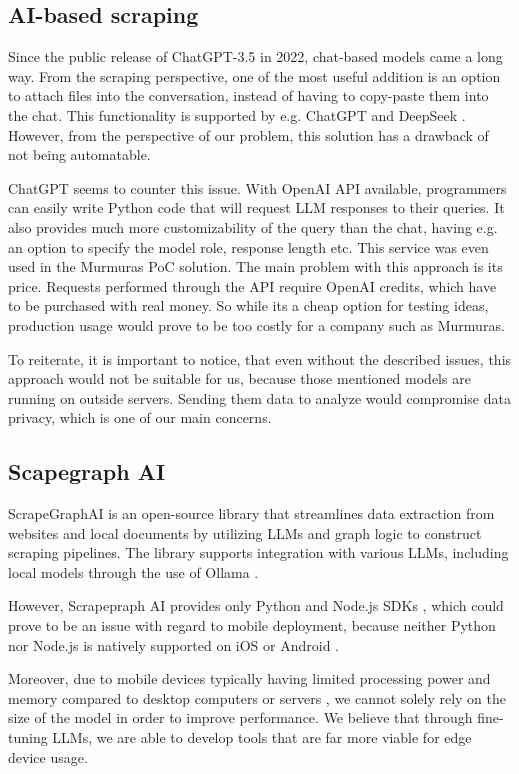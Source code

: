 \documentclass[licencjacka,en]{pracamgr}
\begin{document}
\subsection{AI-based scraping}
Since the public release of ChatGPT-3.5 in 2022, chat-based models came a long way. From the scraping perspective, one of the most useful addition is an option to attach files into the conversation, instead of having to copy-paste them into the chat. This functionality is supported by e.g. ChatGPT and DeepSeek \cite{DS}. However, from the perspective of our problem, this solution has a drawback of not being automatable.

ChatGPT seems to counter this issue. With OpenAI API \cite{OAPI} available, programmers can easily write Python code that will request LLM responses to their queries. It also provides much more customizability of the query than the chat, having e.g. an option to specify the model role, response length etc. This service was even used in the Murmuras PoC solution. The main problem with this approach is its price. Requests performed through the API require OpenAI credits, which have to be purchased with real money. So while its a cheap option for testing ideas, production usage would prove to be too costly for a company such as Murmuras.

To reiterate, it is important to notice, that even without the described issues, this approach would not be suitable for us, because those mentioned models are running on outside servers. Sending them data to analyze would compromise data privacy, which is one of our main concerns.

\subsection{Scapegraph AI}
ScrapeGraphAI\cite{scapegraph_repo} is an open-source library that streamlines data extraction from websites and local documents by utilizing LLMs and graph logic to construct scraping pipelines. The library supports integration with various LLMs, including local models through the use of Ollama \cite{ollama_repo, scapegraph_usage}.

However, Scrapepraph AI provides only Python and Node.js SDKs \cite{scapegraph_sdks}, which could prove to be an issue with regard to mobile deployment, because neither Python nor Node.js is natively supported on iOS or Android \cite{android_dev_site, ios_dev_site}.

Moreover, due to mobile devices typically having limited processing power and memory compared to desktop computers or servers \cite{mobile_resources}, we cannot solely rely on the size of the model in order to improve performance. We believe that through fine-tuning LLMs, we are able to develop tools that are far more viable for edge device usage.
\end{document}
